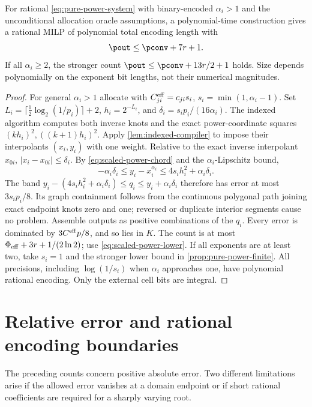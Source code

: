 \begin{theorem}\label{thm:rational-powers}
For rational \eqref{eq:pure-power-system} with binary-encoded
$\alpha_i>1$ and the unconditional allocation oracle assumptions,
a polynomial-time construction gives a rational MILP of polynomial
total encoding length with
\begin{equation}\label{eq:rational-power-count}
 \pout\le\pconv+7r+1.
\end{equation}
If all $\alpha_i\ge2$, the stronger count
$\pout\le\pconv+13r/2+1$ holds. Size depends polynomially on the
exponent bit lengths, not their numerical magnitudes.
\end{theorem}
\begin{proof}
For general $\alpha_i>1$ allocate with $C^{\rm eff}_{ji}=c_{ji}s_i$,
$s_i=\min(1,\alpha_i-1)$. Set
$L_i=\lceil\frac12\log_2(1/p_i)\rceil+2$,
$h_i=2^{-L_i}$, and $\delta_i=s_ip_i/(16\alpha_i)$.
The indexed algorithm computes both inverse knots and the exact
power-coordinate squares $(kh_i)^2,((k+1)h_i)^2$. Apply
\cref{lem:indexed-compiler} to impose their interpolants $(x_i,y_i)$
with one weight. Relative to the exact inverse interpolant $x_{0i}$,
$|x_i-x_{0i}|\le\delta_i$. By
\eqref{eq:scaled-power-chord} and the $\alpha_i$-Lipschitz bound,
\[
 -\alpha_i\delta_i\le y_i-x_i^{\alpha_i}
 \le4s_ih_i^2+\alpha_i\delta_i.
\]
The band
$y_i-(4s_ih_i^2+\alpha_i\delta_i)\le q_i
\le y_i+\alpha_i\delta_i$ therefore has error at most
$3s_ip_i/8$. Its graph containment follows from the continuous
polygonal path joining exact endpoint knots zero and one; reversed
or duplicate interior segments cause no problem. Assemble outputs
as positive combinations of the $q_i$. Every error is dominated by
$3C^{\rm eff}p/8$, and so lies in $K$.
The count is at most $\Phi_{\rm eff}+3r+1/(2\ln2)$; use
\eqref{eq:scaled-power-lower}. If all exponents are at least two,
take $s_i=1$ and the stronger lower bound in
\cref{prop:pure-power-finite}. All precisions, including
$\log(1/s_i)$ when $\alpha_i$ approaches one, have polynomial
rational encoding. Only the external cell bits are integral.
\end{proof}

\section{Relative error and rational encoding boundaries}
\label{sec:encoding-boundaries}

The preceding counts concern positive absolute error. Two different
limitations arise if the allowed error vanishes at a domain endpoint or if
short rational coefficients are required for a sharply varying root.

